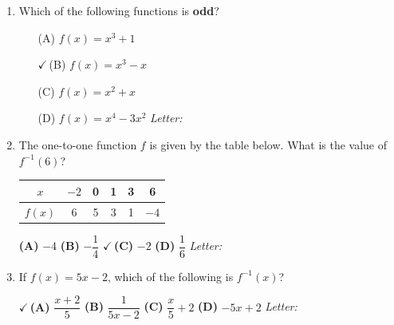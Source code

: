\documentclass[10pt]{article}
\begin{document}
\begin{enumerate}[leftmargin=1.9em, itemsep=14pt]

\item Which of the following functions is \textbf{odd}?
      \begin{enumerate}[leftmargin=2.6em, itemsep=2pt]
        \item[(A)] $f(x) = x^3 + 1$
        \item[{\color{keyred}$\checkmark$\,(B)}] $f(x) = x^3 - x$
        \item[(C)] $f(x) = x^2 + x$
        \item[(D)] $f(x) = x^4 - 3x^2$ \hfill\textit{Letter:}~\gradedblank[id=ap1, type=choice, points=1, answer=B]{0.42in}{13pt}
      \end{enumerate}

\item The one-to-one function $f$ is given by the table below. What is the value of $f^{-1}(6)$?

      \smallskip
      \begin{center}
      \renewcommand{\arraystretch}{1.3}
      \begin{tabular}{|c|c|c|c|c|c|}
      \hline $x$ & $-2$ & 0 & 1 & 3 & 6 \\ \hline $f(x)$ & 6 & 5 & 3 & 1 & $-4$ \\ \hline
      \end{tabular}
      \end{center}

      \smallskip
      \textbf{(A)} $-4$ \hspace{2.6em} \textbf{(B)} $-\dfrac{1}{4}$ \hspace{2.6em} {\color{keyred}\textbf{$\checkmark$\,(C)}} $-2$ \hspace{2.6em} \textbf{(D)} $\dfrac{1}{6}$ \hfill\textit{Letter:}~\gradedblank[id=ap2, type=choice, points=1, answer=C]{0.42in}{13pt}

\item If $f(x) = 5x - 2$, which of the following is $f^{-1}(x)$?

      \smallskip
      {\color{keyred}\textbf{$\checkmark$\,(A)}} $\dfrac{x + 2}{5}$ \hspace{2.6em} \textbf{(B)} $\dfrac{1}{5x - 2}$ \hspace{2.6em} \textbf{(C)} $\dfrac{x}{5} + 2$ \hspace{2.6em} \textbf{(D)} $-5x + 2$ \hfill\textit{Letter:}~\gradedblank[id=ap3, type=choice, points=1, answer=A]{0.42in}{13pt}


\end{enumerate}
\end{document}
